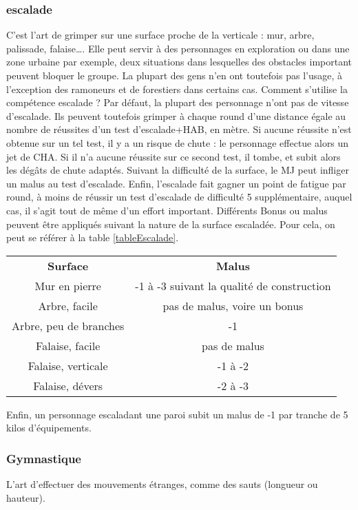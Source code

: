 \documentclass[10pt,a4paper,twocolumn]{book}
\begin{document}
\subsubsection{escalade}
C’est l’art de grimper sur une surface proche de la verticale : mur, arbre, palissade, falaise…. Elle peut servir à des personnages en exploration ou dans une zone urbaine par exemple, deux situations dans lesquelles des obstacles important peuvent bloquer le groupe. La plupart des gens n’en ont toutefois pas l’usage, à l’exception des ramoneurs et de forestiers dans certains cas.
Comment s’utilise la compétence escalade ?
Par défaut, la plupart des personnage n’ont pas de vitesse d’escalade. Ils peuvent toutefois grimper à chaque round d’une distance égale au nombre de réussites d’un test d’escalade+HAB, en mètre.
Si aucune réussite n’est obtenue sur un tel test, il y a un risque de chute : le personnage effectue alors un jet de CHA. Si il n’a aucune réussite sur ce second test, il tombe, et subit alors les dégâts de chute adaptés.
Suivant la difficulté de la surface, le MJ peut infliger un malus au test d’escalade.
Enfin, l’escalade fait gagner un point de fatigue par round, à moins de réussir un test d’escalade de difficulté 5 supplémentaire, auquel cas, il s’agit tout de même d’un effort important.
Différents Bonus ou malus peuvent être appliqués suivant la nature de la surface escaladée. Pour cela, on peut se référer à la table \ref{tableEscalade}.
\begin{table*}
\caption{ Surfaces d'escalade :}
\label{tableEscalade}
\begin{center}
\begin{tabular}{cc}
\textbf{Surface} & \textbf{Malus} \\
   Mur en pierre & -1 à -3 suivant la qualité de construction\\
   Arbre, facile & pas de malus, voire un bonus\\
   Arbre, peu de branches & -1\\
   Falaise, facile & pas de malus\\
   Falaise, verticale & -1 à -2\\
   Falaise, dévers & -2 à -3\\
\end{tabular}
\end{center}
\end{table*}

Enfin, un personnage escaladant une paroi subit un malus de -1 par tranche de 5 kilos d’équipements.
\subsubsection{Gymnastique}
L’art d’effectuer des mouvements étranges, comme des sauts (longueur ou hauteur).
\end{document}

